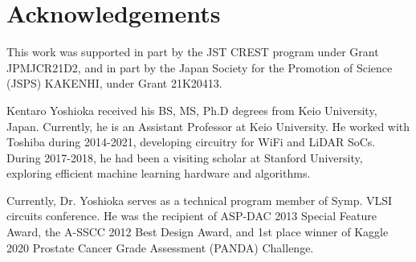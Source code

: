 \documentclass[letterpaper, 10 pt, conference]{ieeeconf}  %
\begin{document}
\section*{Acknowledgements}
This work was supported in part by the JST CREST program under Grant JPMJCR21D2, and in part by the Japan Society for the Promotion of Science (JSPS) KAKENHI, under Grant 21K20413.





\begin{IEEEbiography}
{Kentaro Yoshioka}
received his BS, MS, Ph.D degrees from Keio University, Japan. Currently, he is an Assistant Professor at Keio University. He worked with Toshiba during 2014-2021, developing circuitry for WiFi and LiDAR SoCs. During 2017-2018, he had been a visiting scholar at Stanford University, exploring efficient machine learning hardware and algorithms. 

Currently, Dr. Yoshioka serves as a technical program member of Symp. VLSI circuits conference. He was the recipient of ASP-DAC 2013 Special Feature Award, the A-SSCC 2012 Best Design Award, and 1st place winner of Kaggle 2020 Prostate Cancer Grade Assessment (PANDA) Challenge.
\end{IEEEbiography}
\end{document}
